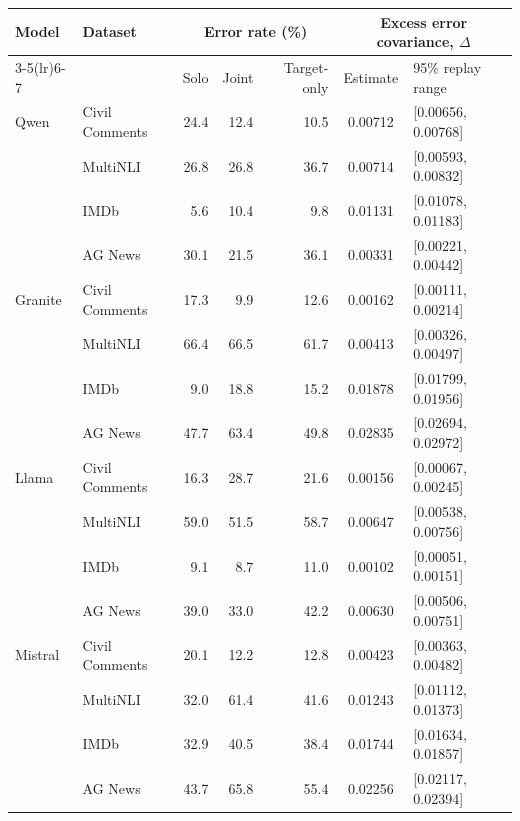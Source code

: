\begin{tabular}{llrrrcl}
\toprule
Model & Dataset & \multicolumn{3}{c}{Error rate (\%)} & \multicolumn{2}{c}{Excess error covariance, $\Delta$} \\
\cmidrule(lr){3-5}\cmidrule(lr){6-7}
 & & Solo & Joint & Target-only & Estimate & 95\% replay range \\
\midrule
Qwen & Civil Comments & 24.4 & 12.4 & 10.5 & 0.00712 & [0.00656, 0.00768] \\
 & MultiNLI & 26.8 & 26.8 & 36.7 & 0.00714 & [0.00593, 0.00832] \\
 & IMDb & 5.6 & 10.4 & 9.8 & 0.01131 & [0.01078, 0.01183] \\
 & AG News & 30.1 & 21.5 & 36.1 & 0.00331 & [0.00221, 0.00442] \\
\midrule
Granite & Civil Comments & 17.3 & 9.9 & 12.6 & 0.00162 & [0.00111, 0.00214] \\
 & MultiNLI & 66.4 & 66.5 & 61.7 & 0.00413 & [0.00326, 0.00497] \\
 & IMDb & 9.0 & 18.8 & 15.2 & 0.01878 & [0.01799, 0.01956] \\
 & AG News & 47.7 & 63.4 & 49.8 & 0.02835 & [0.02694, 0.02972] \\
\midrule
Llama & Civil Comments & 16.3 & 28.7 & 21.6 & 0.00156 & [0.00067, 0.00245] \\
 & MultiNLI & 59.0 & 51.5 & 58.7 & 0.00647 & [0.00538, 0.00756] \\
 & IMDb & 9.1 & 8.7 & 11.0 & 0.00102 & [0.00051, 0.00151] \\
 & AG News & 39.0 & 33.0 & 42.2 & 0.00630 & [0.00506, 0.00751] \\
\midrule
Mistral & Civil Comments & 20.1 & 12.2 & 12.8 & 0.00423 & [0.00363, 0.00482] \\
 & MultiNLI & 32.0 & 61.4 & 41.6 & 0.01243 & [0.01112, 0.01373] \\
 & IMDb & 32.9 & 40.5 & 38.4 & 0.01744 & [0.01634, 0.01857] \\
 & AG News & 43.7 & 65.8 & 55.4 & 0.02256 & [0.02117, 0.02394] \\
\bottomrule
\end{tabular}

